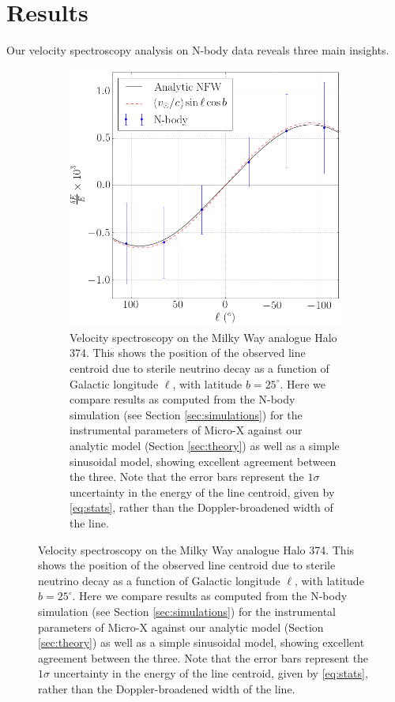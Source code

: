 \documentclass[aps,prd,10pt,twocolumn,superscriptaddress,showpacs]{revtex4-1}
\begin{document}
\section{Results}
\label{sec:results}

Our velocity spectroscopy analysis on N-body data reveals three main insights.

\begin{figure}[h!]
\centering
\begin{figure}[h!]
\centering
\includegraphics[width=1.0\columnwidth]{de_vs_l.png}
\caption{Velocity spectroscopy on the Milky Way analogue Halo 374. This shows the position of the observed line centroid due to sterile
	neutrino decay as a function of Galactic longitude $\ell$, with latitude $b=25^\circ$.
	Here we compare results as computed from the N-body simulation (see Section \ref{sec:simulations}) for the
	instrumental parameters of Micro-X against our analytic model (Section
	\ref{sec:theory}) as well as a simple sinusoidal model, showing excellent agreement between the
	three. Note that the error bars represent the $1\sigma$ uncertainty
in the energy of the line centroid, given by \eqref{eq:stats}, rather than the Doppler-broadened width of the line.}
\label{fig:de_vs_l}
\end{figure}



\end{figure}
\end{document}
